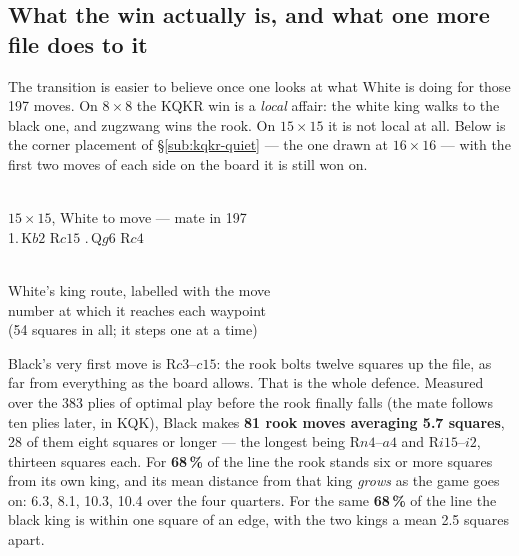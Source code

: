 \documentclass[11pt]{article}
\begin{document}
\subsection{What the win actually is, and what one more file does to it}\label{sub:kqkr-mechanism}

The transition is easier to believe once one looks at what White is doing for
those 197 moves. On $8\times8$ the KQKR win is a \emph{local} affair: the white
king walks to the black one, and zugzwang wins the rook. On $15\times15$ it is
not local at all. Below is the corner placement of \S\ref{sub:kqkr-quiet} --- the one drawn at
$16\times16$ --- with the first two moves of each side on the board it is still
won on.

\begin{center}
\begin{minipage}[b]{0.46\textwidth}\centering
  \\[1.5mm]
  {\scriptsize\color{kqkr}$15\times15$, White to move --- mate in 197\\
   1.\,K$b2$ R$c15$ .\,Q$g6$ R$c4$}
\end{minipage}\hfill
\begin{minipage}[b]{0.46\textwidth}\centering
  \\[1.5mm]
  {\scriptsize\color{kqkr}White's king route, labelled with the move\\
   number at which it reaches each waypoint\\(54 squares in all; it steps one at a time)}
\end{minipage}
\end{center}

\noindent
Black's very first move is R$c3$--$c15$: the rook bolts twelve squares up the
file, as far from everything as the board allows. That is the whole defence.
Measured over the 383 plies of optimal play before the rook finally falls
(the mate follows ten plies later, in KQK), Black makes \textbf{81 rook moves
averaging 5.7 squares}, 28 of them eight squares or longer --- the longest being
R$n4$--$a4$ and R$i15$--$i2$, thirteen squares each. For \textbf{68\,\%} of the
line the rook stands six or more squares from its own king, and its mean
distance from that king \emph{grows} as the game goes on: 6.3, 8.1, 10.3, 10.4
over the four quarters. For the same \textbf{68\,\%} of the line the black king
is within one square of an edge, with the two kings a mean 2.5 squares apart.
\end{document}
